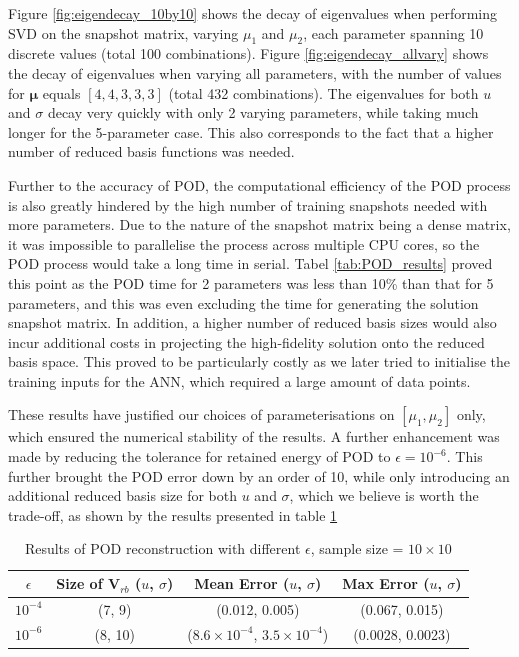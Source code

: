 Figure \ref{fig:eigendecay_10by10} shows the decay of eigenvalues when performing SVD on the snapshot matrix, varying $\mu_1$ and $\mu_2$, each parameter spanning 10 discrete values (total 100 combinations). Figure \ref{fig:eigendecay_allvary} shows the decay of eigenvalues when varying all parameters, with the number of values for $\bm{\mu}$ equals $[4,4,3,3,3]$ (total 432 combinations). The eigenvalues for both  $u$ and $\sigma$ decay very quickly with only 2 varying parameters, while taking much longer for the 5-parameter case. This also corresponds to the fact that a higher number of reduced basis functions was needed.  

Further to the accuracy of POD, the computational efficiency of the POD process is also greatly hindered by the high number of training snapshots needed with more parameters. Due to the nature of the snapshot matrix being a dense matrix, it was impossible to parallelise the process across multiple CPU cores, so the POD process would take a long time in serial. Tabel \ref{tab:POD_results} proved this point as the POD time for 2 parameters was less than 10\% than that for 5 parameters, and this was even excluding the time for generating the solution snapshot matrix. In addition, a higher number of reduced basis sizes would also incur additional costs in projecting the high-fidelity solution onto the reduced basis space. This proved to be particularly costly as we later tried to initialise the training inputs for the ANN, which required a large amount of data points.

These results have justified our choices of parameterisations on $[\mu_1, \mu_2]$ only, which ensured the numerical stability of the results. A further enhancement was made by reducing the tolerance for retained energy of POD to $\epsilon = 10^{-6}$. This further brought the POD error down by an order of 10, while only introducing an additional reduced basis size for both $u$ and $\sigma$, which we believe is worth the trade-off, as shown by the results presented in table \ref{tab:POD_results_different_epsilon}

\begin{table}[htb]
    \centering
    \caption{Results of POD reconstruction with different $\epsilon$, sample size = $10 \times 10$}
    \small
    \begin{tabular}{c|c|c|c}
        \toprule
        $\epsilon$ & Size of $\mathbf{V}_{rb}$ ($u$, $\sigma$) & Mean Error ($u$, $\sigma$) & Max Error ($u$, $\sigma$) \\
        \midrule
        $10^{-4}$ & (7, 9) & (0.012, 0.005) & (0.067, 0.015) \\
        $10^{-6}$ & (8, 10) & ($8.6 \times 10^{-4}$, $3.5 \times 10^{-4}$) & (0.0028, 0.0023)  \\
        \bottomrule
    \end{tabular}
    \label{tab:POD_results_different_epsilon}
\end{table}

